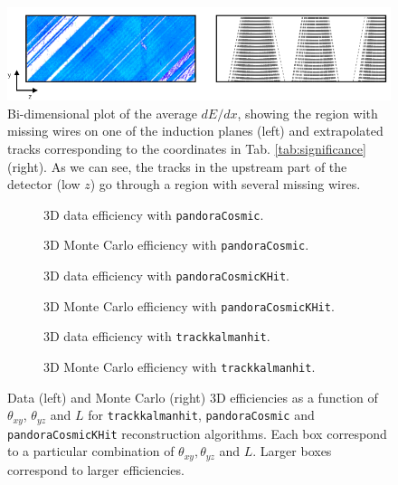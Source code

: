 \documentclass[a4paper]{scrartcl}
\begin{document}
\begin{figure}[htbp]
  \begin{center}
    \includegraphics[width=1\linewidth]{figures/wire_tracks.png}
    \caption{Bi-dimensional plot of the average $dE/dx$, showing the region with missing wires on one of the induction planes (left) and extrapolated tracks corresponding to the coordinates in Tab. \ref{tab:significance} (right). As we can see, the tracks in the upstream part of the detector (low $z$) go through a region with several missing wires.} \label{fig:wires}
  \end{center}
\end{figure}




\begin{figure}[htbp]
  \begin{subfigure}{0.5\textwidth}
    \caption{3D data efficiency with \texttt{pandoraCosmic}.} \label{fig:pandora_3D}
  \end{subfigure}
  \hspace*{\fill}
  \begin{subfigure}{0.5\textwidth}
    \caption{3D Monte Carlo efficiency with \texttt{pandoraCosmic}.}\label{fig:pandora_3D_mc}
  \end{subfigure}
  \begin{subfigure}{0.5\textwidth}
    \caption{3D data efficiency with \texttt{pandoraCosmicKHit}.} \label{fig:pandoraKHit_3D}
  \end{subfigure}
  \hspace*{\fill}
  \begin{subfigure}{0.5\textwidth}
    \caption{3D Monte Carlo efficiency with \texttt{pandoraCosmicKHit}.}\label{fig:pandoraKHit_3D_mc}
  \end{subfigure}
  \begin{subfigure}{0.5\textwidth}
    \caption{3D data efficiency with \texttt{trackkalmanhit}.} \label{fig:tk_3D}
  \end{subfigure}
  \hspace*{\fill}
  \begin{subfigure}{0.5\textwidth}
    \caption{3D Monte Carlo efficiency with \texttt{trackkalmanhit}.}\label{fig:tk_3D_mc}
  \end{subfigure}
  \caption{Data (left) and Monte Carlo (right) 3D efficiencies  as a function of $\theta_{xy}$, $\theta_{yz}$ and $L$ for \texttt{track\-kal\-man\-hit}, \texttt{pan\-do\-ra\-Co\-smic} and \texttt{pan\-do\-ra\-Co\-smicKHit} reconstruction algorithms. Each box correspond to a particular combination of $\theta_{xy}, \theta_{yz}$ and $L$. Larger boxes correspond to larger efficiencies.} \label{fig:3Deff}
\end{figure}
\end{document}
